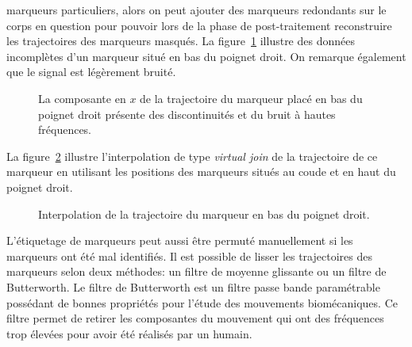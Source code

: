 marqueurs particuliers, alors on peut ajouter des marqueurs redondants sur le corps en question
pour pouvoir lors de la phase de post-traitement reconstruire les trajectoires des 
marqueurs masqués.
La figure~\ref{fig:BadData} illustre des données incomplètes d'un marqueur
situé en bas du poignet droit. On remarque également que le signal est légèrement bruité.
\begin{figure}[p]
  \begin{center}
  \resizebox{.75\textwidth}{!} {
    
    }
  \end{center}
  \caption[Discontinuités de la trajectoire d'un marqueur.]{La composante en $x$ de la trajectoire du marqueur placé en bas du poignet droit présente
  des discontinuités et du bruit à hautes fréquences.}
  \label{fig:BadData}
\end{figure}
La figure~\ref{fig:RwristVjoin} illustre l'interpolation de type \emph{virtual join} de la trajectoire de ce marqueur
en utilisant les positions des marqueurs situés au coude et en haut du poignet droit.
\begin{figure}[p]
  \begin{center}
  \resizebox{.75\textwidth}{!} {
    
    }
  \end{center}
  \caption{Interpolation de la trajectoire du marqueur en bas du poignet droit.}
  \label{fig:RwristVjoin}
\end{figure}
L'étiquetage de marqueurs peut aussi être permuté manuellement si les marqueurs ont été mal identifiés.
Il est possible de lisser les trajectoires des marqueurs selon deux méthodes: un filtre de moyenne glissante ou
un filtre de Butterworth.
Le filtre de Butterworth est un filtre passe bande paramétrable possédant
de bonnes propriétés pour l'étude des mouvements biomécaniques. Ce filtre permet 
de retirer les composantes du mouvement qui ont des fréquences trop élevées pour avoir été réalisés
par un humain.

